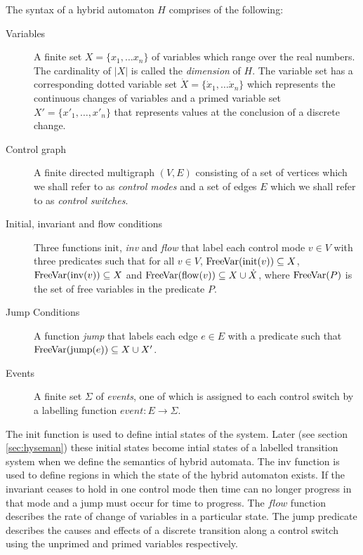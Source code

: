 \medskip
\begin{mydef}
The syntax of a hybrid automaton $H$ comprises of the following:
\begin{description}
\item[Variables] A finite set $X = \{x_1, \ldots x_n \}$ of variables which range over the real numbers. The cardinality of $|X|$ is called the \emph{dimension} of $H$. The variable set has a corresponding dotted variable set $\dot{X} = \{\dot{x}_1, \ldots \dot{x}_n \}$ which represents the continuous changes of variables and a primed variable set $X' = \{x'_1, \ldots , x'_n \}$ that represents  values at the conclusion of a discrete change.

\item[Control graph] A finite directed multigraph $(V,E)$ consisting of a set of vertices which we shall refer to as \emph{control modes} and a set of edges $E$ which we shall refer to as \emph{control switches}.

\item[Initial, invariant and flow conditions] Three functions $\mathrm{init}$, \emph{inv} and \emph{flow} that label each control mode $v \in V$ with three predicates such that for all $v \in V$, $\mathrm{FreeVar}(\mathrm{init}(v)) \subseteq X$, $\mathrm{FreeVar}(\mathrm{inv}(v)) \subseteq X$ and $\mathrm{FreeVar}(\mathrm{flow}(v)) \subseteq X \cup \dot{X}$, where $\mathrm{FreeVar}(P)$ is the set of free variables in the predicate $P$.


\item[Jump Conditions] A function \emph{jump} that labels each edge $e \in E$ with a predicate such that $\mathrm{FreeVar}(\mathrm{jump}(e)) \subseteq X \cup X' $.

\item[Events] A finite set $\Sigma$ of \emph{events}, one of which is assigned to  each control switch by a labelling function $event: E \to \Sigma$.

\end{description}

\end{mydef}
\medskip
 
The $\mathrm{init}$ function is used to define intial states of the system. Later (see section \ref{sec:hyseman}) these initial states become intial states of a labelled transition system when we define the semantics of hybrid automata. The $\mathrm{inv}$ function is used to define regions in which the state of the hybrid automaton exists. If the invariant ceases to hold in one control mode then time can no longer progress in that mode and a jump must occur for time to progress. The $flow$ function describes the rate of change of variables in a particular state. The $\mathrm{jump}$ predicate describes the causes and effects of a discrete transition along a control switch using the unprimed and primed variables respectively.

